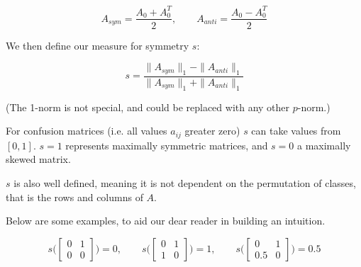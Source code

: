 \documentclass{article}
\begin{document}
\begin{equation}
	A_{sym} = \frac{A_0 + A_0^T}{2}, \qquad
	A_{anti} = \frac{A_0 - A_0^T}{2}
\end{equation}

We then define our measure for symmetry $s$:

\begin{equation}
	s = \frac{ \|A_{sym}\|_1 - \|A_{anti}\|_1}{\|A_{sym}\|_1 + \|A_{anti}\|_1}
\end{equation}

(The 1-norm is not special, and could be replaced with any other $p$-norm.)

For confusion matrices (i.e. all values $a_{ij}$ greater zero) $s$ can take values from $[0,1]$. $s = 1$ represents maximally symmetric matrices, and $s = 0$ a maximally skewed matrix.

$s$ is also well defined, meaning it is not dependent on the permutation of classes, that is the rows and columns of $A$.

Below are some examples, to aid our dear reader in building an intuition.

\begin{equation*}
	s\bigg(\begin{bmatrix}
		0 & 1 \\
		0 & 0
	\end{bmatrix}\bigg) = 0, \qquad
%
	s\bigg(\begin{bmatrix}
		0 & 1 \\
		1 & 0
	\end{bmatrix}\bigg) = 1, \qquad
%
	s\bigg( \begin{bmatrix}
		0 & 1 \\
		0.5 & 0
	\end{bmatrix}\bigg) = 0.5
\end{equation*}
%
%
\end{document}
